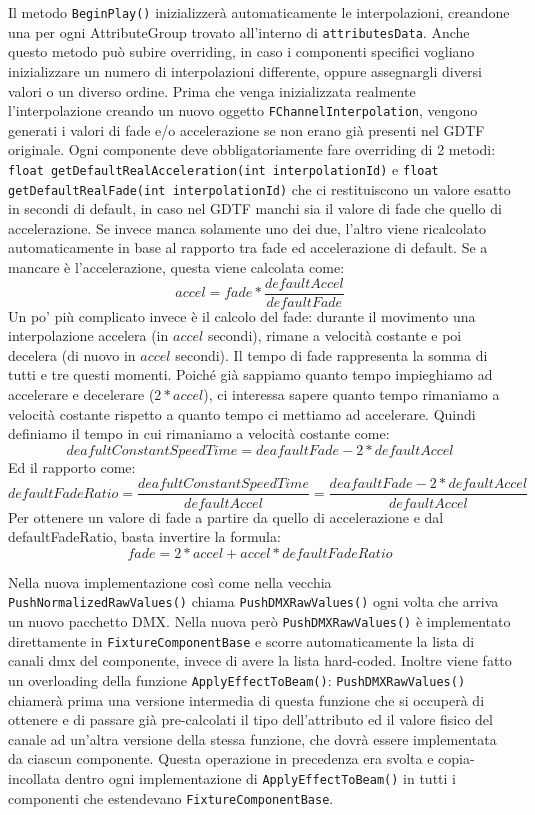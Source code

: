 \documentclass[main.tex]{subfiles}
\begin{document}
Il metodo \lstinline{BeginPlay()} inizializzerà automaticamente le interpolazioni, creandone una per ogni AttributeGroup trovato all'interno di \lstinline{attributesData}. Anche questo metodo può subire overriding, in caso i componenti specifici vogliano inizializzare un numero di interpolazioni differente, oppure assegnargli diversi valori o un diverso ordine. Prima che venga inizializzata realmente l'interpolazione creando un nuovo oggetto \lstinline{FChannelInterpolation}, vengono generati i valori di fade e/o accelerazione se non erano già presenti nel GDTF originale. Ogni componente deve obbligatoriamente fare overriding di 2 metodi: \lstinline{float getDefaultRealAcceleration(int interpolationId)} e \lstinline{float getDefaultRealFade(int interpolationId)} che ci restituiscono un valore esatto in secondi di default, in caso nel GDTF manchi sia il valore di fade che quello di accelerazione. Se invece manca solamente uno dei due, l'altro viene ricalcolato automaticamente in base al rapporto tra fade ed accelerazione di default. Se a mancare è l'accelerazione, questa viene calcolata come:
\[accel = fade * \frac{defaultAccel}{defaultFade}\]
\clearpage %
Un po' più complicato invece è il calcolo del fade: durante il movimento una interpolazione accelera (in $accel$ secondi), rimane a velocità costante e poi decelera (di nuovo in $accel$ secondi). Il tempo di fade rappresenta la somma di tutti e tre questi momenti. Poiché già sappiamo quanto tempo impieghiamo ad accelerare e decelerare ($2 * accel$), ci interessa sapere quanto tempo rimaniamo a velocità costante rispetto a quanto tempo ci mettiamo ad accelerare. Quindi definiamo il tempo in cui rimaniamo a velocità costante come:
\[deafultConstantSpeedTime = deafaultFade - 2 * defaultAccel\] 
Ed il rapporto come:
\[defaultFadeRatio = \frac{deafultConstantSpeedTime}{defaultAccel} = \frac{deafaultFade - 2 * defaultAccel}{defaultAccel}\]
Per ottenere un valore di fade a partire da quello di accelerazione e dal defaultFadeRatio, basta invertire la formula:
\[fade = 2 * accel + accel * defaultFadeRatio\]

Nella nuova implementazione così come nella vecchia \lstinline{PushNormalizedRawValues()} chiama \lstinline{PushDMXRawValues()} ogni volta che arriva un nuovo pacchetto DMX. Nella nuova però \lstinline{PushDMXRawValues()} è implementato direttamente in \lstinline{FixtureComponentBase} e scorre automaticamente la lista di canali dmx del componente, invece di avere la lista hard-coded. Inoltre viene fatto un overloading della funzione \lstinline{ApplyEffectToBeam()}: \lstinline{PushDMXRawValues()} chiamerà prima una versione intermedia di questa funzione che si occuperà di ottenere e di passare già pre-calcolati il tipo dell'attributo ed il valore fisico del canale ad un'altra versione della stessa funzione, che dovrà essere implementata da ciascun componente. Questa operazione in precedenza era svolta e copia-incollata dentro ogni implementazione di \lstinline{ApplyEffectToBeam()} in tutti i componenti che estendevano \lstinline{FixtureComponentBase}.
\end{document}
